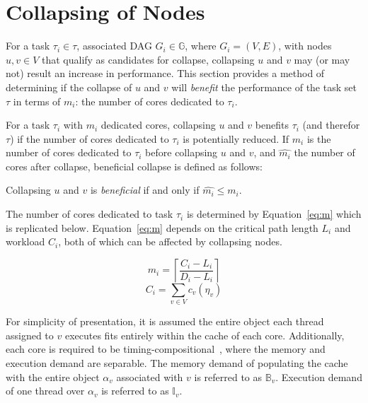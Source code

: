 \section{Collapsing of Nodes}
\newcommand{\tex}[1]{cbound/#1}

\label{sec:collapse-bound}

For a task ${\tau_i \in \tau}$, associated DAG
${G_i \in \mathbb{G}}$, where ${G_i = (V, E)}$, with nodes
${u,v \in V}$ that qualify as candidates for collapse, collapsing
${u}$ and ${v}$ may (or may not) result an increase in
performance. This section provides a method of determining if the
collapse of ${u}$ and ${v}$ will \emph{benefit} the performance of the 
task set ${\tau}$ in terms of ${m_i}$: the number of cores
dedicated to ${\tau_i}$.

For a task ${\tau_i}$ with ${m_i}$ dedicated cores, collapsing
${u}$ and ${v}$ benefits ${\tau_i}$ (and therefor ${\tau}$) if the
number of cores dedicated to ${\tau_i}$ is potentially reduced. If
${m_i}$ is the number of cores dedicated to ${\tau_i}$ before
collapsing ${u}$ and ${v}$, and ${\hat{m_i}}$ the number of
cores after collapse, beneficial collapse is defined as follows: 

\begin{definition}
  Collapsing ${u}$ and ${v}$ is \emph{beneficial} if and only if
  ${\hat{m_i} \le m_i}$.
\end{definition}

The number of cores dedicated to task ${\tau_i}$ is determined by
Equation~\ref{eq:m} which is replicated below. Equation~\ref{eq:m}
depends on the critical path length ${L_i}$ and workload
${C_i}$, both of which can be affected by collapsing nodes.

\begin{multicols}{2}
  \begin{equation*}
    m_i = \left\lceil
      \frac{C_i - L_i}
           {D_i - L_i}
    \right\rceil
  \end{equation*}
  \begin{equation*}
    C_i = \sum_{v \in V} c_v(\eta_v)
  \end{equation*}
\end{multicols}

For simplicity of presentation, it is assumed the entire object each
thread assigned to ${v}$ executes fits entirely within the
cache of each core. Additionally, each core is required to be
timing-compositional~\addcite{}, where the memory and execution demand
are separable. The memory demand of populating the cache with the
entire object ${\alpha_v}$ associated with ${v}$ is referred to as
${\mathbb{B}_v}$. Execution demand of one thread over ${\alpha_v}$ is
referred to as ${\mathbb{I}_v}$. 

